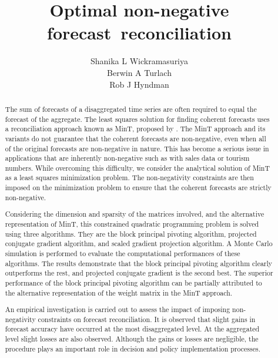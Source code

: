 \documentclass[11pt]{article}
\title{Optimal non-negative forecast~reconciliation}
\author{Shanika L Wickramasuriya\\ Berwin A Turlach\\ Rob J Hyndman}
\newcommand{\0}{\phantom{0}}
\begin{document}
\titlepage

\begin{abstract}
	The sum of forecasts of a disaggregated time series are often required to equal the forecast of the aggregate. The least squares solution for finding coherent forecasts uses a reconciliation approach known as MinT, proposed by \citet{Wick2018}. The MinT approach and its variants do not guarantee that the coherent forecasts are non-negative, even when all of the original forecasts are non-negative in nature. This has become a serious issue in applications that are inherently non-negative such as with sales data or tourism numbers. While overcoming this difficulty, we consider the analytical solution of MinT as a least squares minimization problem. The non-negativity constraints are then imposed on the minimization problem to ensure that the coherent forecasts are strictly non-negative.

	Considering the dimension and sparsity of the matrices involved, and the alternative representation of MinT, this constrained quadratic programming problem is solved using three algorithms. They are the block principal pivoting algorithm, projected conjugate gradient algorithm, and scaled gradient projection algorithm. A Monte Carlo simulation is performed to evaluate the computational performances of these algorithms. The results demonstrate that the block principal pivoting algorithm clearly outperforms the rest, and projected conjugate gradient is the second best. The superior performance of the block principal pivoting algorithm can be partially attributed to the alternative representation of the weight matrix in the MinT approach.


	An empirical investigation is carried out to assess the impact of imposing non-negativity constraints on forecast reconciliation. It is observed that slight gains in forecast accuracy have occurred at the most disaggregated level. At the aggregated level slight losses are also observed. Although the gains or losses are negligible, the procedure plays an important role in decision and policy implementation processes.

\end{abstract}
\end{document}
